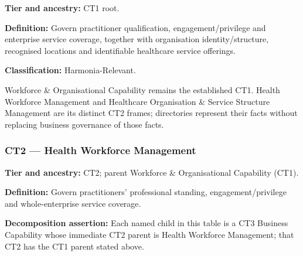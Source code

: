 \textbf{Tier and ancestry:} CT1 root.

\label{rad:business:910}

\textbf{Definition:} Govern practitioner qualification, engagement/\allowbreak{}privilege and enterprise service coverage, together with organisation identity/\allowbreak{}structure, recognised locations and identifiable healthcare service offerings.

\label{rad:business:912}

\textbf{Classification:} Harmonia-Relevant.

\label{rad:business:914}

Workforce \& Organisational Capability remains the established CT1. Health Workforce Management and Healthcare Organisation \& Service Structure Management are its distinct CT2 frames; directories represent their facts without replacing business governance of those facts.

\label{rad:business:916}
\subsubsection*{CT2 — Health Workforce Management}
\label{rad:business:918}

\textbf{Tier and ancestry:} CT2; parent Workforce \& Organisational Capability (CT1).

\label{rad:business:920}

\textbf{Definition:} Govern practitioners’ professional standing, engagement/\allowbreak{}privilege and whole-enterprise service coverage.

\label{rad:business:922}

\textbf{Decomposition assertion:} Each named child in this table is a CT3 Business Capability whose immediate CT2 parent is Health Workforce Management; that CT2 has the CT1 parent stated above.

